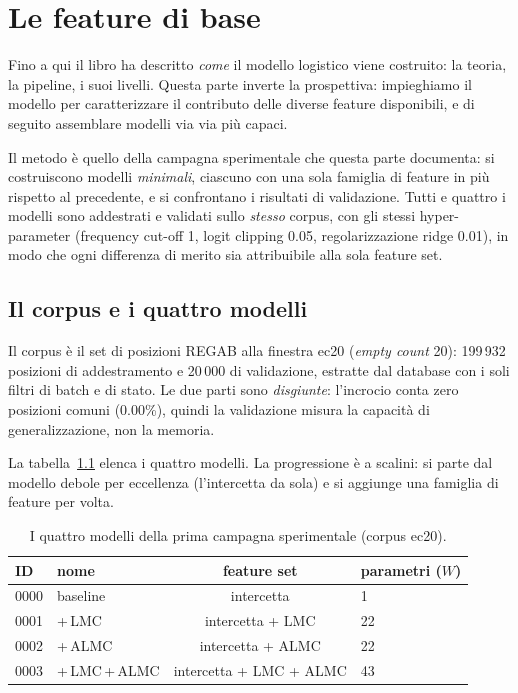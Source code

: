 \chapter{Le feature di base}
\label{ch:feature-base}

Fino a qui il libro ha descritto \emph{come} il modello logistico viene
costruito: la teoria, la pipeline, i suoi livelli. Questa parte inverte
la prospettiva: impieghiamo il modello per caratterizzare il contributo
delle diverse feature disponibili, e di seguito assemblare modelli via
via più capaci.

Il metodo è quello della campagna sperimentale che questa parte
documenta: si costruiscono modelli \emph{minimali}, ciascuno con una
sola famiglia di feature in più rispetto al precedente, e si
confrontano i risultati di validazione. Tutti e quattro i modelli sono
addestrati e validati sullo \emph{stesso} corpus, con gli stessi
hyper-parameter (frequency cut-off 1, logit clipping 0.05, regolarizzazione
ridge 0.01), in modo che ogni differenza di merito sia attribuibile
alla sola feature set.

\section{Il corpus e i quattro modelli}

Il corpus è il set di posizioni REGAB alla finestra ec20 (\emph{empty
count} 20): 199\,932 posizioni di addestramento e 20\,000 di
validazione, estratte dal database con i soli filtri di batch e di
stato. Le due parti sono \emph{disgiunte}: l'incrocio conta zero
posizioni comuni (0.00\%), quindi la validazione misura la capacità di
generalizzazione, non la memoria.

La tabella~\ref{tab:feature-base-modelli} elenca i quattro modelli. La
progressione è a scalini: si parte dal modello debole per eccellenza
(l'intercetta da sola) e si aggiunge una famiglia di feature per
volta.

\begin{table}[ht]
\centering
\begin{tabular}{llcl}
\toprule
ID & nome & feature set & parametri ($W$) \\
\midrule
0000 & baseline & intercetta & 1 \\
0001 & +\,LMC & intercetta + LMC & 22 \\
0002 & +\,ALMC & intercetta + ALMC & 22 \\
0003 & +\,LMC\,+\,ALMC & intercetta + LMC + ALMC & 43 \\
\bottomrule
\end{tabular}
\caption{I quattro modelli della prima campagna sperimentale (corpus ec20).}
\label{tab:feature-base-modelli}
\end{table}

